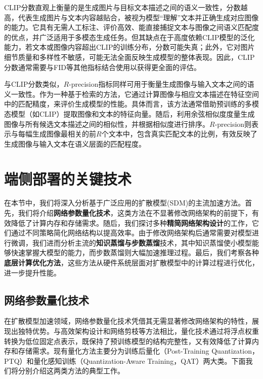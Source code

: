 \documentclass[11pt,a4paper,UTF8]{ctexart}
\begin{document}
CLIP分数直观上衡量的是生成图片与目标文本描述之间的语义一致性，分数越高，代表生成图片与文本内容越贴合，被视为模型“理解”文本并正确生成对应图像的能力。它具有无需人工标注、评价高效、能直接捕捉文本与图像之间语义匹配度的优点，并广泛适用于多模态生成任务。但其缺点在于高度依赖CLIP模型的泛化能力，若文本或图像内容超出CLIP的训练分布，分数可能失真；此外，它对图片细节质量和多样性不敏感，可能无法全面反映生成模型的整体表现。因此，CLIP分数通常需要与FID等其他指标结合使用以获得更全面的评估。

与CLIP分数类似，$R$-precision指标\cite{xu2018attngan}同样可用于衡量生成图像与输入文本之间的语义一致性。作为一种基于检索的方法，它通过计算图像与相应文本描述在特征空间中的匹配精度，来评价生成模型的性能。具体而言，该方法通常借助预训练的多模态模型（如CLIP）提取图像和文本的特征向量。随后，利用余弦相似度度量生成图像与所有候选文本描述之间的相似性，并根据相似度进行排序。$R$-precision则表示与每幅生成图像最相关的前$R$个文本中，包含真实匹配文本的比例，有效反映了生成图像与输入文本在语义层面的匹配程度。


\newpage

\section{端侧部署的关键技术}

在本节中，我们将深入分析基于广泛应用的扩散模型(SDM)的主流加速方法。首先，我们将介绍\textbf{网络参数量化技术}，这类方法在不显著修改网络架构的前提下，有效降低了计算内存和存储需求。随后，我们探讨多种\textbf{精简网络架构设计}的工作，它们通过不同策略简化网络结构以提高效率。由于修改网络架构后通常需要对模型进行微调，我们进而分析主流的\textbf{知识蒸馏与步数蒸馏}技术，其中知识蒸馏使小模型能够快速掌握大模型的能力，而步数蒸馏则大幅加速推理过程。最后，我们考察各种\textbf{底层计算优化方法}，这些方法从硬件系统层面对扩散模型中的计算过程进行优化，进一步提升性能。

\subsection{网络参数量化技术}

在扩散模型加速领域，网络参数量化技术凭借其无需显著修改网络架构的特性，展现出独特优势。与高效架构设计和网络剪枝等方法相比，量化技术通过将浮点权重转换为低位固定点表示\cite{gholami2022survey,jin2022fnet}，既保持了预训练模型的结构完整性，又有效降低了计算内存和存储需求。现有量化方法主要分为训练后量化（Post-Training Quantization，PTQ）和量化感知训练（Quantization-Aware Training，QAT）两大类。下面我们将分别介绍这两类方法的典型工作。
\end{document}
